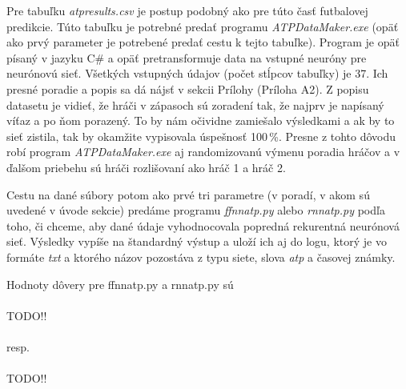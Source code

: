 Pre tabuľku \textit{atpresults.csv} je postup podobný ako pre túto časť futbalovej predikcie.
Túto tabuľku je potrebné predať programu \textit{ATPDataMaker.exe} (opäť ako prvý parameter je potrebené predať cestu k tejto tabuľke).
Program je opäť písaný v jazyku C\# a opäť pretransformuje data na vstupné neuróny pre neurónovú sieť.
Všetkých vstupných údajov (počet stĺpcov tabuľky) je 37.
Ich presné poradie a popis sa dá nájsť v sekcii Prílohy (Príloha A2).
Z popisu datasetu je vidieť, že hráči v zápasoch sú zoradení tak, že najprv je napísaný víťaz a po ňom porazený. To by nám očividne zamiešalo výsledkami a ak by to sieť zistila, tak by okamžite vypisovala úspešnosť 100\,\%.
Presne z tohto dôvodu robí program \textit{ATPDataMaker.exe} aj randomizovanú výmenu poradia hráčov a v ďalšom priebehu sú hráči rozlišovaní ako hráč 1 a hráč 2.

Cestu na dané súbory potom ako prvé tri parametre (v poradí, v akom sú uvedené v úvode sekcie) predáme programu \textit{ffnnatp.py} alebo \textit{rnnatp.py} podľa toho, či chceme, aby dané údaje vyhodnocovala popredná rekurentná neurónová sieť.
Výsledky vypíše na štandardný výstup a uloží ich aj do logu, ktorý je vo formáte \textit{txt} a ktorého názov pozostáva z typu siete, slova \textit{atp} a časovej známky.

Hodnoty dôvery pre ffnnatp.py a rnnatp.py sú \\\\
TODO!!\\\\
resp.\\\\
TODO!!\\\\
